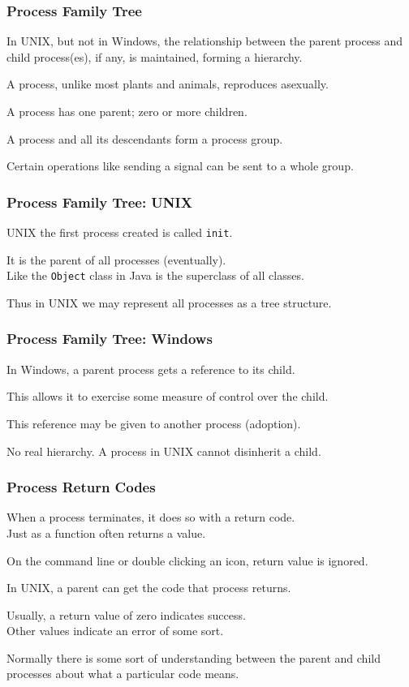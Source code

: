\begin{frame}
\frametitle{Process Family Tree}
In UNIX, but not in Windows, the relationship between the parent process and child process(es), if any, is maintained, forming a hierarchy.

A process, unlike most plants and animals, reproduces asexually.

A process has one parent; zero or more children.

A process and all its descendants form a \alert{process group}.

Certain operations like sending a signal can be sent to a whole group.

\end{frame}

\begin{frame}
\frametitle{Process Family Tree: UNIX}
UNIX the first process created is called \texttt{init}.

It is the parent of all processes (eventually).\\
\quad Like the \texttt{Object} class in Java is the superclass of all classes.

Thus in UNIX we may represent all processes as a tree structure.

\end{frame}

\begin{frame}
\frametitle{Process Family Tree: Windows}

In Windows, a parent process gets a reference to its child.

This allows it to exercise some measure of control over the child. 

This reference may be given to another process (adoption).

No real hierarchy. A process in UNIX cannot disinherit a child.


\end{frame}

\begin{frame}
\frametitle{Process Return Codes}

When a process terminates, it does so with a return code.\\
\quad  Just as a function often returns a value. 

On the command line or double clicking an icon, return value is ignored.

In UNIX, a parent can get the code that process returns.

Usually, a return value of zero indicates success.\\
\quad Other values indicate an error of some sort. 

Normally there is some sort of understanding between the parent and child processes about what a particular code means. 

\end{frame}


